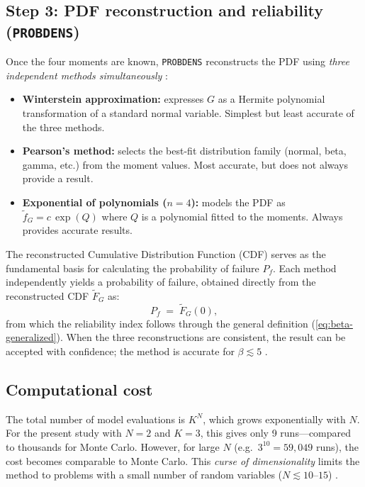 \subsection{Step 3: PDF reconstruction and reliability (\texttt{PROBDENS})} \label{sec:quad-pdf}
Once the four moments are known, \texttt{PROBDENS} reconstructs the PDF using \emph{three independent methods simultaneously} \cite{sudret2003}:
\begin{itemize}
    \item \textbf{Winterstein approximation:} expresses $G$ as a Hermite polynomial transformation of a standard normal variable. Simplest but least accurate of the three methods.
    \item \textbf{Pearson's method:} selects the best-fit distribution family (normal, beta, gamma, etc.) from the moment values. Most accurate, but does not always provide a result.
    \item \textbf{Exponential of polynomials ($n=4$):} models the PDF as $\tilde{f}_G = c\,\exp(Q)$ where $Q$ is a polynomial fitted to the moments. Always provides accurate results.
\end{itemize}

The reconstructed Cumulative Distribution Function (CDF) serves as the fundamental basis for calculating the probability of failure $P_f$. Each method independently yields a probability of failure, obtained directly from the reconstructed CDF $\tilde{F}_G$ as:
\begin{equation}
    P_f \;=\; \tilde{F}_G(0),
    \label{eq:pf-quad}
\end{equation}
from which the reliability index follows through the general definition (\cref{eq:beta-generalized}). When the three reconstructions are consistent, the result can be accepted with confidence; the method is accurate for $\beta \lesssim 5$ \cite{sudret2003}.

\subsection{Computational cost} \label{sec:quad-cost}

The total number of model evaluations is $K^N$, which grows exponentially with $N$. For the present study with $N = 2$ and $K = 3$, this gives only 9 runs---compared to thousands for Monte Carlo. However, for large $N$ (e.g.\ $3^{10} = 59{,}049$ runs), the cost becomes comparable to Monte Carlo. This \emph{curse of dimensionality} limits the method to problems with a small number of random variables ($N \lesssim 10$--$15$) \cite{sudret2003}.

